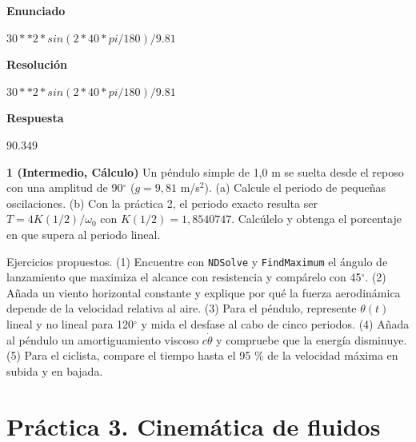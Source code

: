 \documentclass[10pt,openany]{book}
\begin{document}
\begin{tcolorbox}[title={Problema resuelto}, studiumworked, breakable]

\noindent\textbf{Enunciado}

\(30**2*sin(2*40*pi/180)/9.81\)

\noindent\textbf{Resolución}

\(30**2*sin(2*40*pi/180)/9.81\)

\noindent\textbf{Respuesta}

\(90.349\)
\end{tcolorbox}

\begin{tcolorbox}[title={Ejercicios propuestos}, studiumworked, breakable]

\noindent\textbf{1 (Intermedio, Cálculo)}
Un péndulo simple de 1,0 m se suelta desde el reposo con una amplitud de 90\(^\circ\) (\(g = 9{,}81\) m/s\(^2\)). (a) Calcule el periodo de pequeñas oscilaciones. (b) Con la práctica 2, el periodo exacto resulta ser \(T = 4K(1/2)/\omega_0\) con \(K(1/2) = 1{,}8540747\). Calcúlelo y obtenga el porcentaje en que supera al periodo lineal.
\end{tcolorbox}

\begin{tcolorbox}[title={Autoevaluación}, studiumcheck, breakable]

Ejercicios propuestos. (1) Encuentre con \texttt{NDSolve} y \texttt{FindMaximum} el ángulo de lanzamiento que maximiza el alcance con resistencia y compárelo con 45\(^\circ\). (2) Añada un viento horizontal constante y explique por qué la fuerza aerodinámica depende de la velocidad relativa al aire. (3) Para el péndulo, represente \(\theta(t)\) lineal y no lineal para 120\(^\circ\) y mida el desfase al cabo de cinco periodos. (4) Añada al péndulo un amortiguamiento viscoso \(c\dot\theta\) y compruebe que la energía disminuye. (5) Para el ciclista, compare el tiempo hasta el 95 \% de la velocidad máxima en subida y en bajada.
\end{tcolorbox}
\studiumchaptercheck

\chapter{Práctica 3. Cinemática de fluidos}
\label{chap:m03}

\end{document}
